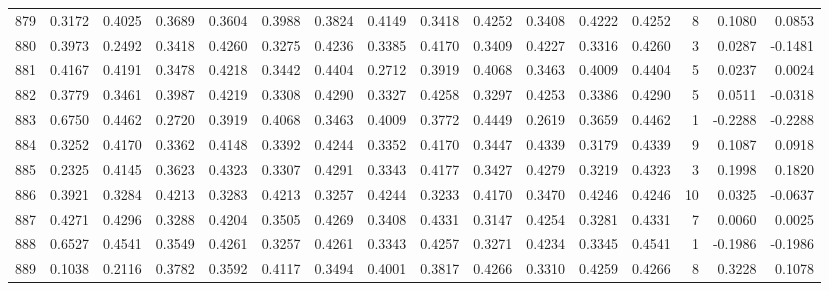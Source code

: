 \begin{tabular}{lrrrrrrrrrrrrrrr}
879 &      0.3172 &  0.4025 &  0.3689 &  0.3604 &  0.3988 &  0.3824 &  0.4149 &  0.3418 &  0.4252 &  0.3408 &   0.4222 &     0.4252 &      8 &                    0.1080 &                     0.0853 \\
880 &      0.3973 &  0.2492 &  0.3418 &  0.4260 &  0.3275 &  0.4236 &  0.3385 &  0.4170 &  0.3409 &  0.4227 &   0.3316 &     0.4260 &      3 &                    0.0287 &                    -0.1481 \\
881 &      0.4167 &  0.4191 &  0.3478 &  0.4218 &  0.3442 &  0.4404 &  0.2712 &  0.3919 &  0.4068 &  0.3463 &   0.4009 &     0.4404 &      5 &                    0.0237 &                     0.0024 \\
882 &      0.3779 &  0.3461 &  0.3987 &  0.4219 &  0.3308 &  0.4290 &  0.3327 &  0.4258 &  0.3297 &  0.4253 &   0.3386 &     0.4290 &      5 &                    0.0511 &                    -0.0318 \\
883 &      0.6750 &  0.4462 &  0.2720 &  0.3919 &  0.4068 &  0.3463 &  0.4009 &  0.3772 &  0.4449 &  0.2619 &   0.3659 &     0.4462 &      1 &                   -0.2288 &                    -0.2288 \\
884 &      0.3252 &  0.4170 &  0.3362 &  0.4148 &  0.3392 &  0.4244 &  0.3352 &  0.4170 &  0.3447 &  0.4339 &   0.3179 &     0.4339 &      9 &                    0.1087 &                     0.0918 \\
885 &      0.2325 &  0.4145 &  0.3623 &  0.4323 &  0.3307 &  0.4291 &  0.3343 &  0.4177 &  0.3427 &  0.4279 &   0.3219 &     0.4323 &      3 &                    0.1998 &                     0.1820 \\
886 &      0.3921 &  0.3284 &  0.4213 &  0.3283 &  0.4213 &  0.3257 &  0.4244 &  0.3233 &  0.4170 &  0.3470 &   0.4246 &     0.4246 &     10 &                    0.0325 &                    -0.0637 \\
887 &      0.4271 &  0.4296 &  0.3288 &  0.4204 &  0.3505 &  0.4269 &  0.3408 &  0.4331 &  0.3147 &  0.4254 &   0.3281 &     0.4331 &      7 &                    0.0060 &                     0.0025 \\
888 &      0.6527 &  0.4541 &  0.3549 &  0.4261 &  0.3257 &  0.4261 &  0.3343 &  0.4257 &  0.3271 &  0.4234 &   0.3345 &     0.4541 &      1 &                   -0.1986 &                    -0.1986 \\
889 &      0.1038 &  0.2116 &  0.3782 &  0.3592 &  0.4117 &  0.3494 &  0.4001 &  0.3817 &  0.4266 &  0.3310 &   0.4259 &     0.4266 &      8 &                    0.3228 &                     0.1078 \\

\end{tabular}

